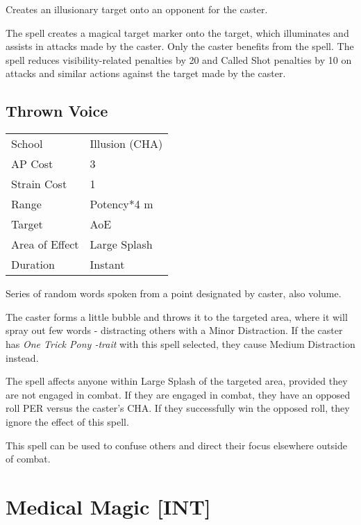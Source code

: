 \documentclass[11pt,a4paper,twocolumn]{book}
\begin{document}
\medskip

Creates an illusionary target onto an opponent for the caster.

The spell creates a magical target marker onto the target, which illuminates and assists in attacks made by the caster. Only the caster benefits from the spell. The spell reduces visibility-related penalties by 20 and Called Shot penalties by 10 on attacks and similar actions against the target made by the caster.

\vfill

\subsection*{Thrown Voice}
{
	\begin{tabu} to 75mm{| X[l,4] | X[l,7] |}
		\hline
		School 			& Illusion (CHA) 				\\
		AP Cost	      	& 3								\\
		Strain Cost     & 1 							\\
		Range     		& Potency*4 m 					\\
		Target      	& AoE							\\
		Area of Effect  & Large Splash 	 				\\
		Duration     	& Instant						\\ \hline
	\end{tabu}
	
}

\medskip

Series of random words spoken from a point designated by caster, also volume.

The caster forms a little bubble and throws it to the targeted area, where it will spray out few words - distracting others with a Minor Distraction. If the caster has \textit{One Trick Pony -trait} with this spell selected, they cause Medium Distraction instead.

The spell affects anyone within Large Splash of the targeted area, provided they are not engaged in combat. If they are engaged in combat, they have an opposed roll PER versus the caster's CHA. If they successfully win the opposed roll, they ignore the effect of this spell.

This spell can be used to confuse others and direct their focus elsewhere outside of combat.


\section*{Medical Magic [INT]}
\end{document}
